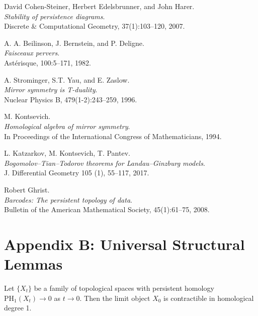 \documentclass[11pt]{article}
\begin{document}
\begin{thebibliography}{9}

David Cohen-Steiner, Herbert Edelsbrunner, and John Harer.\\
\textit{Stability of persistence diagrams}.\\
Discrete \& Computational Geometry, 37(1):103--120, 2007.

A. A. Beilinson, J. Bernstein, and P. Deligne.\\
\textit{Faisceaux pervers}.\\
Astérisque, 100:5–171, 1982.

A. Strominger, S.T. Yau, and E. Zaslow.\\
\textit{Mirror symmetry is T-duality}.\\
Nuclear Physics B, 479(1-2):243–259, 1996.

M. Kontsevich.\\
\textit{Homological algebra of mirror symmetry}.\\
In Proceedings of the International Congress of Mathematicians, 1994.

L. Katzarkov, M. Kontsevich, T. Pantev.\\
\textit{Bogomolov–Tian–Todorov theorems for Landau–Ginzburg models}.\\
J. Differential Geometry 105 (1), 55–117, 2017.

Robert Ghrist.\\
\textit{Barcodes: The persistent topology of data}.\\
Bulletin of the American Mathematical Society, 45(1):61--75, 2008.

\end{thebibliography}


\section*{Appendix B: Universal Structural Lemmas}

\begin{lemma}
Let $\{X_t\}$ be a family of topological spaces with persistent homology $\mathrm{PH}_1(X_t) \to 0$ as $t \to 0$.  
Then the limit object $X_0$ is contractible in homological degree 1.
\end{lemma}
\end{document}
